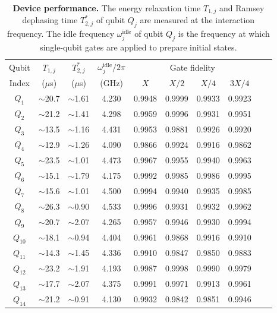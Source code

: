 \documentclass[reprint,superscriptaddress,preprintnumbers,longbibliography,
amsmath,amssymb,aps,floatfix,pra,twocolumn, tightenlines %
]{revtex4-2}
\begin{document}
\begin{table}[t] 
    \renewcommand\tabcolsep{12.0pt}
    \setlength{\extrarowheight}{2pt} 
    \begin{tabular}{cccccccccc}
      \hline
      \hline
        Qubit  & $T_{1,j}$ & $T^{\ast}_{2, j}$  & $\omega^{\mathrm{idle}}_{j}/2\pi$    & \multicolumn{4}{c}{Gate fidelity}  \\
         Index & ($\mu$s)& ($\mu$s)  & (GHz)   &$X$   & $X/2$  & $X/4$ & $3X/4$ \\
      \hline
      $Q_1$      &$\sim$20.7     & $\sim$1.61    & 4.230     & 0.9948	&0.9999	&0.9933	&0.9923 \\
      $Q_2$      &$\sim$21.2    & $\sim$1.41 & 4.298        & 0.9959	&0.9996	&0.9931	&0.9951 \\
      $Q_{3}$      &$\sim$13.5    & $\sim$1.16 & 4.431        & 0.9953	&0.9881	&0.9926	&0.9920 \\
      $Q_{4}$       &$\sim$12.9   & $\sim$1.26  & 4.090       & 0.9866	&0.9924	&0.9916	&0.9862 \\
      $Q_{5}$       &$\sim$23.5  & $\sim$1.01  & 4.473       & 0.9967	&0.9955	&0.9940	&0.9963 \\
      $Q_{6}$       &$\sim$15.1   & $\sim$1.79  & 4.175      & 0.9992	&0.9985	&0.9986	&0.9995 \\
      $Q_{7}$      &$\sim$15.6    & $\sim$1.01  & 4.500       & 0.9994	&0.9940	&0.9935	&0.9985 \\
      $Q_{8}$       &$\sim$26.3    & $\sim$0.90  & 4.533     & 0.9996  	&0.9931	&0.9932	&0.9962 \\
      $Q_{9}$      &$\sim$20.7   & $\sim$2.07  & 4.265       & 0.9957	&0.9946	&0.9930	&0.9994 \\
      $Q_{10}$     &$\sim$18.1    & $\sim$0.94  & 4.404       & 0.9961	&0.9868	&0.9916	&0.9910 \\
      $Q_{11}$     &$\sim$14.3   & $\sim$1.45  & 4.336       & 0.9910	&0.9847	&0.9850	&0.9883 \\
      $Q_{12}$     &$\sim$23.2    & $\sim$1.91  & 4.193       & 0.9987	&0.9998	&0.9990	&0.9979 \\ 
      $Q_{13}$    &$\sim$17.7    & $\sim$2.07  & 4.375       & 0.9991	&0.9971	&0.9913	&0.9961 \\
      $Q_{14}$    &$\sim$21.2    & $\sim$0.91  & 4.130       & 0.9932	&0.9842	&0.9851	&0.9946 \\

      \hline
      \hline
    \end{tabular}
    
    \caption{{\bf Device performance.} The energy relaxation time \( T_{1,j} \) and Ramsey dephasing time \( T^{\ast}_{2,j} \) of qubit \( Q_j \) are measured at the interaction frequency. The idle frequency \(\omega^{\mathrm{idle}}_{j}\) of qubit \( Q_j \) is the frequency at which single-qubit gates are applied to prepare initial states. 
    } 
    \label{Tab1}
\end{table}	
    
\end{document}
